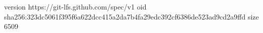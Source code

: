 version https://git-lfs.github.com/spec/v1
oid sha256:323dc5061f395f6a622dcc415a2da7b4fa29edc392cf6386de523ad9cd2a9ffd
size 6509
